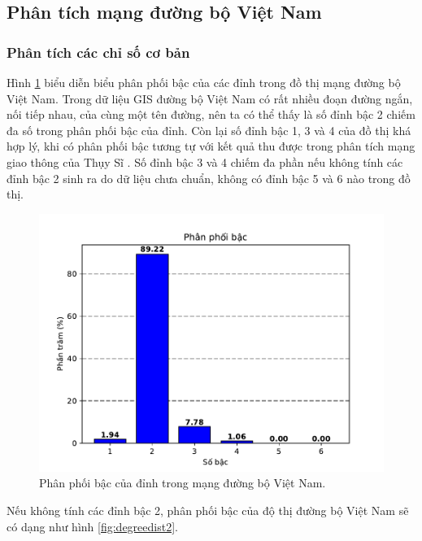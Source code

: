 \documentclass[14pt, oneside, a4paper, openany]{scrartcl}
\begin{document}
\subsection{Phân tích mạng đường bộ Việt Nam}
\subsubsection{Phân tích các chỉ số cơ bản}
Hình \ref{fig:degreedist} biểu diễn biểu phân phối bậc của các đỉnh trong đồ thị mạng đường bộ Việt Nam. Trong dữ liệu GIS đường bộ Việt Nam có rất nhiều đoạn đường ngắn, nối tiếp nhau, của cùng một tên đường, nên ta có thể thấy là số đỉnh bậc 2 chiếm đa số trong phân phối bậc của đỉnh. Còn lại số đỉnh bậc 1, 3 và 4 của đồ thị khá hợp lý, khi có phân phối bậc tương tự với kết quả thu được trong phân tích mạng giao thông của Thụy Sĩ \cite{swissroad}. Số đỉnh bậc 3 và 4 chiếm đa phần nếu không tính các đỉnh bậc 2 sinh ra do dữ liệu chưa chuẩn, không có đỉnh bậc 5 và 6 nào trong đồ thị.

\begin{figure}[!h]
	\centering
	\includegraphics[scale=0.9]{figures/degreedist.pdf} 
	\caption[Phân phối bậc của đỉnh trong mạng đường bộ Việt Nam]{Phân phối bậc của đỉnh trong mạng đường bộ Việt Nam.}
	\label{fig:degreedist}
\end{figure}

Nếu không tính các đỉnh bậc 2, phân phối bậc của độ thị đường bộ Việt Nam sẽ có dạng như hình \ref{fig:degreedist2}.
\end{document}
